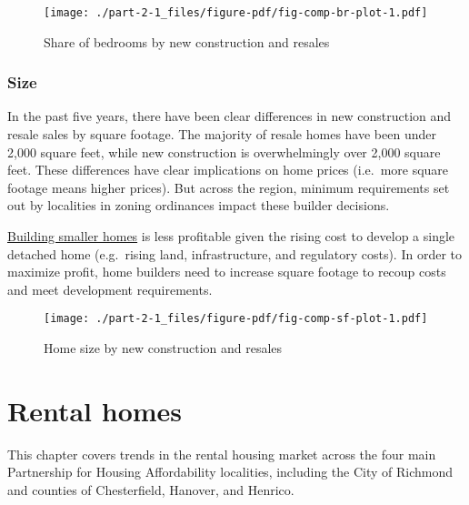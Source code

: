 \documentclass[
  letterpaper,
  DIV=11,
  numbers=noendperiod]{scrreprt}
\begin{document}
\begin{figure}

{\centering \texttt{[image: ./part-2-1\_files/figure-pdf/fig-comp-br-plot-1.pdf]}

}

\caption{\label{fig-comp-br-plot}Share of bedrooms by new construction
and resales}

\end{figure}

\hypertarget{size}{%
\subsection{Size}\label{size}}

In the past five years, there have been clear differences in new
construction and resale sales by square footage. The majority of resale
homes have been under 2,000 square feet, while new construction is
overwhelmingly over 2,000 square feet. These differences have clear
implications on home prices (i.e.~more square footage means higher
prices). But across the region, minimum requirements set out by
localities in zoning ordinances impact these builder decisions.

\href{https://archive.curbed.com/2020/3/10/21168519/homes-for-sale-american-home-suburbs}{Building
smaller homes} is less profitable given the rising cost to develop a
single detached home (e.g.~rising land, infrastructure, and regulatory
costs). In order to maximize profit, home builders need to increase
square footage to recoup costs and meet development requirements.

\begin{figure}

{\centering \texttt{[image: ./part-2-1\_files/figure-pdf/fig-comp-sf-plot-1.pdf]}

}

\caption{\label{fig-comp-sf-plot}Home size by new construction and
resales}

\end{figure}

\hypertarget{part-2-2}{%
\chapter{Rental homes}\label{part-2-2}}

This chapter covers trends in the rental housing market across the four
main Partnership for Housing Affordability localities, including the
City of Richmond and counties of Chesterfield, Hanover, and Henrico.
\end{document}
